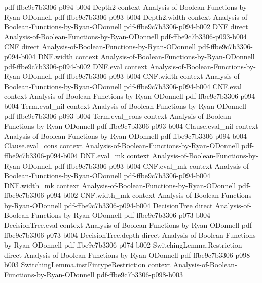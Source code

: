 \begin{lemma}
  {pdf-ffbe9c7b3306-p094-b004}
\proofstep
  {Depth2}
  {context}
  {Analysis-of-Boolean-Functions-by-Ryan-ODonnell}
  {pdf-ffbe9c7b3306-p093-b004}
\proofstep
  {Depth2.width}
  {context}
  {Analysis-of-Boolean-Functions-by-Ryan-ODonnell}
  {pdf-ffbe9c7b3306-p094-b002}
\proofstep
  {DNF}
  {direct}
  {Analysis-of-Boolean-Functions-by-Ryan-ODonnell}
  {pdf-ffbe9c7b3306-p093-b004}
\proofstep
  {CNF}
  {direct}
  {Analysis-of-Boolean-Functions-by-Ryan-ODonnell}
  {pdf-ffbe9c7b3306-p094-b004}
\proofstep
  {DNF.width}
  {context}
  {Analysis-of-Boolean-Functions-by-Ryan-ODonnell}
  {pdf-ffbe9c7b3306-p094-b002}
\proofstep
  {DNF.eval}
  {context}
  {Analysis-of-Boolean-Functions-by-Ryan-ODonnell}
  {pdf-ffbe9c7b3306-p093-b004}
\proofstep
  {CNF.width}
  {context}
  {Analysis-of-Boolean-Functions-by-Ryan-ODonnell}
  {pdf-ffbe9c7b3306-p094-b004}
\proofstep
  {CNF.eval}
  {context}
  {Analysis-of-Boolean-Functions-by-Ryan-ODonnell}
  {pdf-ffbe9c7b3306-p094-b004}
\proofstep
  {Term.eval_nil}
  {context}
  {Analysis-of-Boolean-Functions-by-Ryan-ODonnell}
  {pdf-ffbe9c7b3306-p093-b004}
\proofstep
  {Term.eval_cons}
  {context}
  {Analysis-of-Boolean-Functions-by-Ryan-ODonnell}
  {pdf-ffbe9c7b3306-p093-b004}
\proofstep
  {Clause.eval_nil}
  {context}
  {Analysis-of-Boolean-Functions-by-Ryan-ODonnell}
  {pdf-ffbe9c7b3306-p094-b004}
\proofstep
  {Clause.eval_cons}
  {context}
  {Analysis-of-Boolean-Functions-by-Ryan-ODonnell}
  {pdf-ffbe9c7b3306-p094-b004}
\proofstep
  {DNF.eval_mk}
  {context}
  {Analysis-of-Boolean-Functions-by-Ryan-ODonnell}
  {pdf-ffbe9c7b3306-p093-b004}
\proofstep
  {CNF.eval_mk}
  {context}
  {Analysis-of-Boolean-Functions-by-Ryan-ODonnell}
  {pdf-ffbe9c7b3306-p094-b004}
\proofstep
  {DNF.width_mk}
  {context}
  {Analysis-of-Boolean-Functions-by-Ryan-ODonnell}
  {pdf-ffbe9c7b3306-p094-b002}
\proofstep
  {CNF.width_mk}
  {context}
  {Analysis-of-Boolean-Functions-by-Ryan-ODonnell}
  {pdf-ffbe9c7b3306-p094-b004}
\proofstep
  {DecisionTree}
  {direct}
  {Analysis-of-Boolean-Functions-by-Ryan-ODonnell}
  {pdf-ffbe9c7b3306-p073-b004}
\proofstep
  {DecisionTree.eval}
  {context}
  {Analysis-of-Boolean-Functions-by-Ryan-ODonnell}
  {pdf-ffbe9c7b3306-p073-b004}
\proofstep
  {DecisionTree.depth}
  {direct}
  {Analysis-of-Boolean-Functions-by-Ryan-ODonnell}
  {pdf-ffbe9c7b3306-p074-b002}
\proofstep
  {SwitchingLemma.Restriction}
  {direct}
  {Analysis-of-Boolean-Functions-by-Ryan-ODonnell}
  {pdf-ffbe9c7b3306-p098-b003}
\proofstep
  {SwitchingLemma.instFintypeRestriction}
  {context}
  {Analysis-of-Boolean-Functions-by-Ryan-ODonnell}
  {pdf-ffbe9c7b3306-p098-b003}

\end{lemma}
